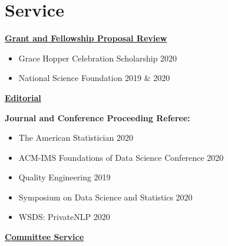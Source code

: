 \documentclass[11pt, letterpaper, roman]{moderncv} %
\begin{document}
\newpage
\section{Service}

\underline{\textbf{\large Grant and Fellowship Proposal Review}}\normalsize

\vspace{4pt}
\begin{itemize}
    \item Grace Hopper Celebration Scholarship 2020
    \item National Science Foundation 2019 \& 2020
\end{itemize}

\vspace{4pt}
\underline{\textbf{\large Editorial}}\normalsize

\textbf{Journal and Conference Proceeding Referee:} 
    \begin{itemize}
        \item The American Statistician 2020
        \item ACM-IMS Foundations of Data Science Conference 2020
        \item Quality Engineering 2019
        \item Symposium on Data Science and Statistics 2020
        \item WSDS: PrivateNLP 2020
    \end{itemize}

\vspace{6pt}
\underline{\textbf{\large Committee Service}}\normalsize

\vspace{2pt}

\vspace{2pt}
\end{document}
